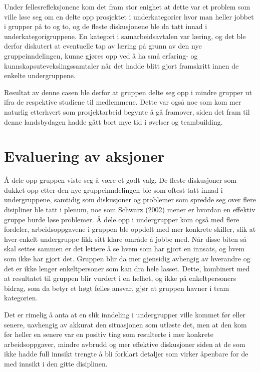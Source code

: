 Under fellesrefleksjonene kom det fram stor enighet at dette var et problem som ville løse seg om en delte opp prosjektet i underkategorier hvor man heller jobbet i grupper på to og to, og de fleste diskusjonene ble da tatt innad i underkategorigruppene. En kategori i samarbeidsavtalen var læring, og det ble derfor diskutert at eventuelle tap av læring på grunn av den nye gruppeinndelingen, kunne gjøres opp ved å ha små erfaring- og kunnskapsutevekslingssamtaler når det hadde blitt gjort framskritt innen de enkelte undergruppene.

Resultat av denne casen ble derfor at gruppen delte seg opp i mindre grupper ut ifra de respektive studiene til medlemmene. Dette var også noe som kom mer naturlig etterhvert som prosjektarbeid begynte å gå framover, siden det fram til denne landsbydagen hadde gått bort mye tid i øvelser og teambuilding.

\section{Evaluering av aksjoner}
Å dele opp gruppen viste seg å være et godt valg. De fleste diskusjoner som dukket opp etter den nye gruppeinndelingen ble som oftest tatt innad i undergruppene, samtidig som diskusjoner og problemer som spredde seg over flere disipliner ble tatt i plenum, noe som Schwarz (2002) mener er hvordan en effektiv gruppe burde løse problemer. \cite{Artikkel3} Å dele opp i undergrupper kom også med flere fordeler, arbeidsoppgavene i gruppen ble oppdelt med mer konkrete skiller, slik at hver enkelt undergruppe fikk sitt klare område å jobbe med. Når disse biten så skal settes sammen er det lettere å se hvem som har gjort en innsats, og hvem som ikke har gjort det. Gruppen blir da mer gjensidig avhengig av hverandre og det er ikke lenger enkeltpersoner som kan dra hele lasset. Dette, kombinert med at resultatet til gruppen blir vurdert i en helhet, og ikke på enkeltpersoners bidrag, som da betyr et høgt felles ansvar, gjør at gruppen havner i team kategorien. \cite{Artikkel4}


Det er rimelig å anta at en slik inndeling i undergrupper ville kommet før eller senere, uavhengig av akkurat den situasjonen som utløste det, men at den kom før heller en senere var en positiv ting som resulterte i mer konkrete arbeidsoppgaver, mindre avbrudd og mer effektive diskusjoner siden at de som ikke hadde full innsikt trengte å bli forklart detaljer som virker åpenbare for de med innsikt i den gitte disiplinen.